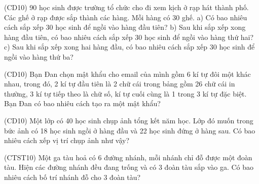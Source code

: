 \documentclass[12pt,a4paper]{article}
\begin{document}
\begin{ex}
(CD10) 90 học sinh được trường tổ chức cho đi xem kịch ở rạp hát thành phố. Các ghế ở rạp được sắp thành các hàng. Mỗi hàng có 30 ghế.
a) Có bao nhiêu cách sắp xếp 30 học sinh để ngồi vào hàng đầu tiên?
b) Sau khi sắp xếp xong hàng đầu tiên, có bao nhiêu cách sắp xếp 30 học sinh để ngồi vào hàng thứ hai?
c) Sau khi sắp xếp xong hai hàng đầu, có bao nhiêu cách sắp xếp 30 học sinh để ngồi vào hàng thứ ba?
\end{ex}

\begin{ex}
(CD10) Bạn Đan chọn mật khẩu cho email của mình gồm 6 kí tự đôi một khác nhau, trong đó, 2 kí tự đầu tiên là 2 chữ cái trong bảng gồm 26 chữ cái in thường, 3 kí tự tiếp theo là chữ số, kí tự cuối cùng là 1 trong 3 kí tự đặc biệt. Bạn Đan có bao nhiêu cách tạo ra một mật khẩu?
\end{ex}

\begin{ex}
(CD10) Một lớp có 40 học sinh chụp ảnh tổng kết năm học. Lớp đó muốn trong bức ảnh có 18 học sinh ngồi ở hàng đầu và 22 học sinh đứng ở hàng sau. Có bao nhiêu cách xếp vị trí chụp ảnh như vậy?
\end{ex}

\begin{ex}
(CTST10) Một ga tàu hoả có 6 đường nhánh, mỗi nhánh chỉ đỗ được một đoàn tàu. Hiện các đường nhánh đều đang trống và có 3 đoàn tàu sắp vào ga. Có bao nhiêu cách bố trí nhánh đỗ cho 3 đoàn tàu?
\end{ex}
\end{document}
